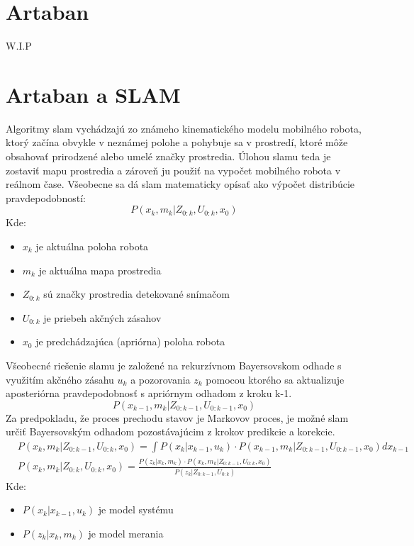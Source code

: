 \section{Artaban}
\begin{center}
    W.I.P
\end{center}

\section{Artaban a SLAM}
Algoritmy \acrshort{slam} vychádzajú zo známeho kinematického modelu mobilného robota, ktorý začína obvykle v neznámej polohe a pohybuje sa v prostredí, ktoré môže obsahovať prirodzené alebo umelé značky prostredia. Úlohou \acrshort{slam}u teda je zostaviť mapu prostredia a zároveň ju použiť na vypočet mobilného robota v reálnom čase.\cite{fs1}\newline
Všeobecne sa dá \acrshort{slam} matematicky opísať ako výpočet distribúcie pravdepodobností:
\begin{equation}
    P(x_k,m_k|Z_{0:k},U_{0:k},x_0)
\end{equation}
Kde:
\begin{itemize}
    \item $x_k$ je aktuálna poloha robota
    \item $m_k$ je aktuálna mapa prostredia
    \item $Z_{0:k}$ sú značky prostredia detekované snímačom
    \item $U_{0:k}$ je priebeh akčných zásahov
    \item $x_0$ je predchádzajúca (apriórna) poloha robota
\end{itemize}
Všeobecné riešenie \acrshort{slam}u je založené na rekurzívnom Bayersovskom odhade s využitím akčného zásahu $u_k$ a pozorovania $z_k$ pomocou ktorého sa aktualizuje aposteriórna pravdepodobnosť s apriórnym odhadom z kroku k-1.\cite{fs2}
\begin{equation}
    P(x_{k-1},m_k|Z_{0:k-1},U_{0:k-1},x_0)
\end{equation}
Za predpokladu, že proces prechodu stavov je Markovov proces, je možné \acrshort{slam} určiť Bayersovským odhadom pozostávajúcim z krokov predikcie a korekcie.\cite{fs2}
\begin{equation}
    \begin{split}
        & P(x_k,m_k|Z_{0:k-1},U_{0:k},x_0)=\int P(x_k|x_{k-1},u_k) \cdot P(x_{k-1},m_k|Z_{0:k-1},U_{0:k-1},x_0)dx_{k-1}\\
        & P(x_k,m_k|Z_{0:k},U_{0:k},x_0)=\frac{P(z_k|x_k,m_k)\cdot P(x_k,m_k|Z_{0:k-1},U_{0:k},x_0)}{P(z_k|Z_{0:k-1},U_{0:k})}
    \end{split}
\end{equation}
Kde:
\begin{itemize}
    \item $P(x_k|x_{k-1},u_k)$ je model systému
    \item $P(z_k|x_k,m_k)$ je model merania
\end{itemize}\newpage

